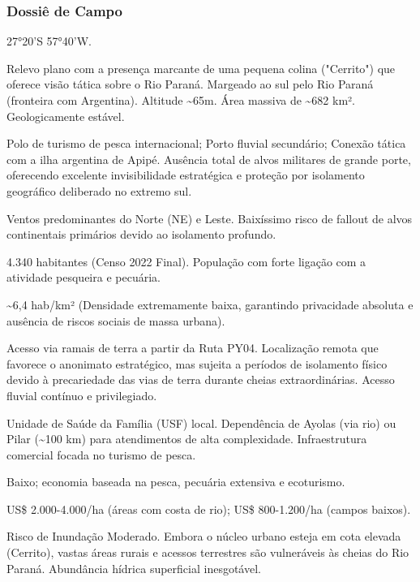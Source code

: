 \subsubsection{Dossiê de Campo}
\begin{description}[style=nextline,leftmargin=0.5cm,font=\bfseries]
\item[Coordenadas]  27°20'S 57°40'W.
\item[Topografia]  Relevo plano com a presença marcante de uma pequena colina ("Cerrito") que oferece visão tática sobre o Rio Paraná. Margeado ao sul pelo Rio Paraná (fronteira com Argentina). Altitude \textasciitilde 65m. Área massiva de \textasciitilde 682 km². Geologicamente estável.
\item[Alvos Estratégicos]  Polo de turismo de pesca internacional; Porto fluvial secundário; Conexão tática com a ilha argentina de Apipé. Ausência total de alvos militares de grande porte, oferecendo excelente invisibilidade estratégica e proteção por isolamento geográfico deliberado no extremo sul.
\item[Fallout]  Ventos predominantes do Norte (NE) e Leste. Baixíssimo risco de fallout de alvos continentais primários devido ao isolamento profundo.
\item[População]  4.340 habitantes (Censo 2022 Final). População com forte ligação com a atividade pesqueira e pecuária.
\item[Densidade]  \textasciitilde 6,4 hab/\allowbreak km² (Densidade extremamente baixa, garantindo privacidade absoluta e ausência de riscos sociais de massa urbana).
\item[Vias de Acesso]  Acesso via ramais de terra a partir da Ruta PY04. Localização remota que favorece o anonimato estratégico, mas sujeita a períodos de isolamento físico devido à precariedade das vias de terra durante cheias extraordinárias. Acesso fluvial contínuo e privilegiado.
\item[Serviços]  Unidade de Saúde da Família (USF) local. Dependência de Ayolas (via rio) ou Pilar (\textasciitilde 100 km) para atendimentos de alta complexidade. Infraestrutura comercial focada no turismo de pesca.
\item[Custo de Vida]  Baixo; economia baseada na pesca, pecuária extensiva e ecoturismo.
\item[Preço da Terra]  US\$ 2.000-4.000/\allowbreak ha (áreas com costa de rio); US\$ 800-1.200/\allowbreak ha (campos baixos).
\item[Hidrologia]  Risco de Inundação Moderado. Embora o núcleo urbano esteja em cota elevada (Cerrito), vastas áreas rurais e acessos terrestres são vulneráveis às cheias do Rio Paraná. Abundância hídrica superficial inesgotável.

\end{description}
